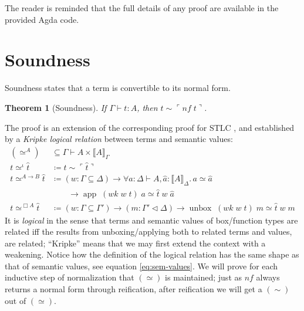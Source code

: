 \documentclass[12pt,twoside,openright]{report}
\numberwithin{equation}{chapter}
\numberwithin{figure}{chapter}
\numberwithin{table}{chapter}
\newtheorem{theorem}{Theorem}
\theoremstyle{definition}\newtheorem{definition}{Definition}
\begin{document}
The reader is reminded that the full details of any proof
are available in the provided Agda code.

\section{Soundness}

Soundness states that a term is convertible to its normal form.
\begin{theorem}[Soundness]
  If $\Gamma \vdash t : A$, then $t \sim \ulcorner \textit{nf} \; t \urcorner$.
\end{theorem}

The proof is an extension of the corresponding proof for STLC \cite{kovacs17},
and established by a \emph{Kripke logical relation} \cite{plotkin73}
between terms and semantic values:
\begin{align*}
  (\simeq^A) &\subseteq \Gamma \vdash A \times \llbracket A \rrbracket_\Gamma \\
  t \simeq^\iota \hat t &\coloneqq t \sim \ulcorner \hat t \urcorner \\
  t \simeq^{A \to B} \hat t &\coloneqq (w : \Gamma \subseteq \Delta) \to \forall a : \Delta \vdash A, \hat a : \llbracket A \rrbracket_\Delta.\, a \simeq \hat a \\
  &\qquad \to \operatorname{app} \; (\textit{wk} \; w \; t) \; a \simeq \hat t \; w \; \hat a \\
  t \simeq^{\Box A} \hat t &\coloneqq (w : \Gamma \subseteq \Gamma') \to (m : \Gamma' \lhd \Delta)
  \to \operatorname{unbox} \; (\textit{wk} \; w \; t) \; m \simeq \hat t \; w \; m
\end{align*}
It is \emph{logical} in the sense that terms and semantic values of box/function types
are related iff the results from unboxing/applying both to related terms and values, are related;
``Kripke'' means that we may first extend the context with a weakening.
Notice how the definition of the logical relation has the same shape
as that of semantic values, see equation \eqref{eq:sem-values}.
We will prove for each inductive step of normalization that $(\simeq)$ is maintained;
just as $\textit{nf}$ always returns a normal form through reification,
after reification we will get a $(\sim)$ out of $(\simeq)$.
\end{document}
